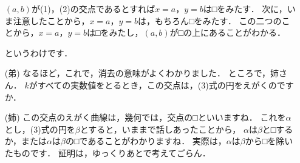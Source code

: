 \documentclass[../../main.tex]{subfiles}
\begin{document}
\begin{enumerate}
    $(a,b)$が(1)，(2)の交点であるとすれば$x=a$，$y=b$は□をみたす．
    次に，いま注意したことから，$x=a$，$y=b$は，もちろん□をみたす．
    この二つのことから，$x=a$，$y=b$は□をみたし，$(a,b)$が□の上にあることがわかる．

    というわけです．
  \item [(弟)]なるほど，これで，消去の意味がよくわかりました．
    ところで，姉さん．
    $k$がすべての実数値をとるとき，この交点は，(3)式の円をえがくのですか．
  \item [(姉)]この交点のえがく曲線は，幾何では，交点の□といいますね．
    これを$\alpha$とし，(3)式の円を$\beta$とすると，いままで話しあったことから，
    $\alpha$は$\beta$と□するか，または$\alpha$は$\beta$の□であることがわかりますね．
    実際は，$\alpha$は$\beta$から□を除いたものです．
    証明は，ゆっくりあとで考えてごらん．
\end{enumerate}
\end{document}
